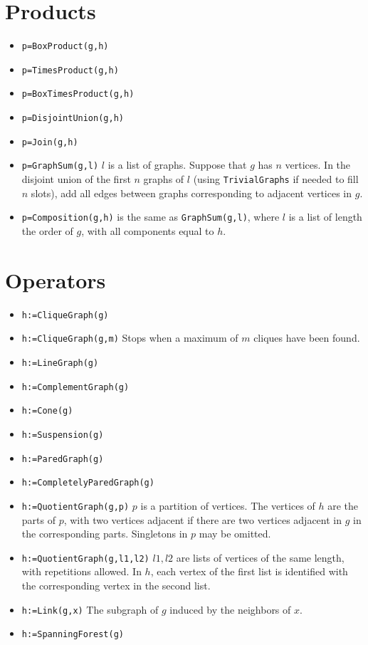 \documentclass[11pt]{article}
\begin{document}
\begin{multicols}{3}
\section{Products}
\label{sec:orgcba1cc0}
\begin{itemize}
\item \texttt{p=BoxProduct(g,h)}
\item \texttt{p=TimesProduct(g,h)}
\item \texttt{p=BoxTimesProduct(g,h)}
\item \texttt{p=DisjointUnion(g,h)}
\item \texttt{p=Join(g,h)}
\item \texttt{p=GraphSum(g,l)} \(l\) is a list of graphs. Suppose that \(g\) has
\(n\) vertices. In the disjoint union of the first \(n\) graphs of
\(l\) (using \texttt{TrivialGraphs} if needed to fill \(n\) slots), add all
edges between graphs corresponding to adjacent vertices in \(g\).
\item \texttt{p=Composition(g,h)} is the same as \texttt{GraphSum(g,l)}, where \(l\) is
a list of length the order of \(g\), with all components equal to
\(h\).
\end{itemize}

\section{Operators}
\label{sec:org1ce4b76}

\begin{itemize}
\item \texttt{h:=CliqueGraph(g)}
\item \texttt{h:=CliqueGraph(g,m)} Stops when a maximum of
\(m\) cliques have been found.
\item \texttt{h:=LineGraph(g)}
\item \texttt{h:=ComplementGraph(g)}
\item \texttt{h:=Cone(g)}
\item \texttt{h:=Suspension(g)}
\item \texttt{h:=ParedGraph(g)}
\item \texttt{h:=CompletelyParedGraph(g)}
\item \texttt{h:=QuotientGraph(g,p)} \(p\) is a partition of vertices. The
vertices of \(h\) are the parts of \(p\), with two vertices adjacent
if there are two vertices adjacent in \(g\) in the corresponding
parts. Singletons in \(p\) may be omitted.
\item \texttt{h:=QuotientGraph(g,l1,l2)} \(l1,l2\) are lists of vertices of the
same length, with repetitions allowed. In \(h\), each vertex of the
first list is identified with the corresponding vertex in the second
list.
\item \texttt{h:=Link(g,x)} The subgraph of \(g\) induced by the neighbors of
\(x\).
\item \texttt{h:=SpanningForest(g)}
\end{itemize}


\end{multicols}
\end{document}
